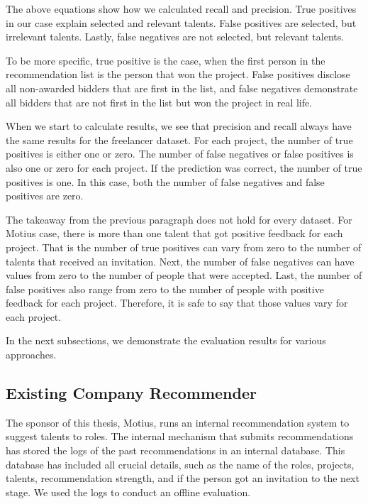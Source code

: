 The above equations show how we calculated recall and precision. True positives in our case explain selected and relevant talents. False positives are selected, but irrelevant talents. Lastly, false negatives are not selected, but relevant talents.

To be more specific, true positive is the case, when the first person in the recommendation list is the person that won the project. False positives disclose all non-awarded bidders that are first in the list, and false negatives demonstrate all bidders that are not first in the list but won the project in real life. 

When we start to calculate results, we see that precision and recall always have the same results for the freelancer dataset. For each project, the number of true positives is either one or zero. The number of false negatives or false positives is also one or zero for each project. If the prediction was correct, the number of true positives is one. In this case, both the number of false negatives and false positives are zero.

The takeaway from the previous paragraph does not hold for every dataset. For Motius case, there is more than one talent that got positive feedback for each project. That is the number of true positives can vary from zero to the number of talents that received an invitation. Next, the number of false negatives can have values from zero to the number of people that were accepted. Last, the number of false positives also range from zero to the number of people with positive feedback for each project. Therefore, it is safe to say that those values vary for each project.

In the next subsections, we demonstrate the evaluation results for various approaches.


\subsection{Existing Company Recommender}\label{evaluation:existing}

The sponsor of this thesis, Motius, runs an internal recommendation system to suggest talents to roles. The internal mechanism that submits recommendations has stored the logs of the past recommendations in an internal database. This database has included all crucial details, such as the name of the roles, projects, talents, recommendation strength, and if the person got an invitation to the next stage. We used the logs to conduct an offline evaluation.

